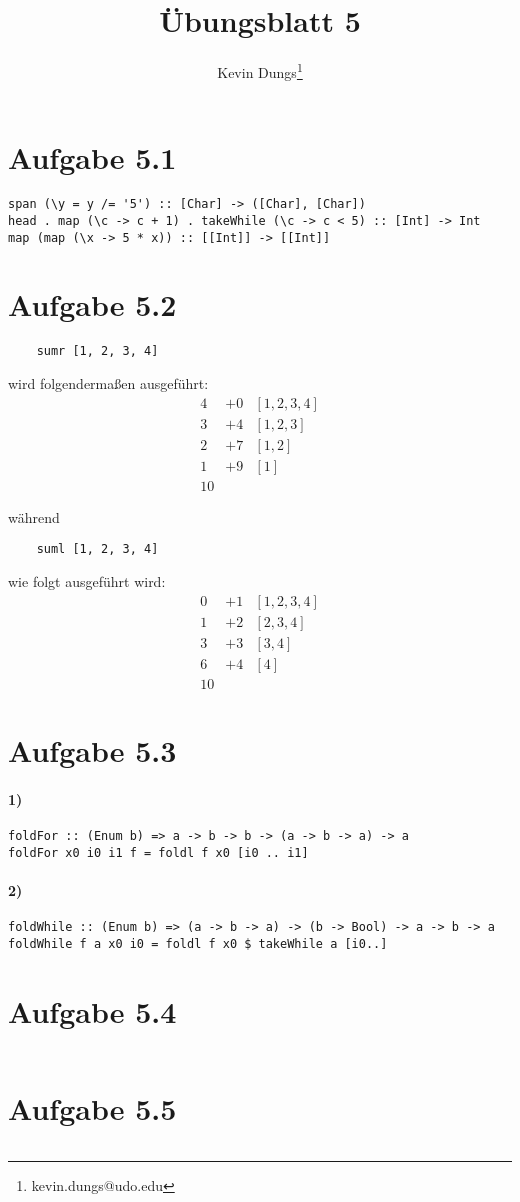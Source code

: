 \documentclass[a4paper]{scrartcl}
\title{Übungsblatt 5}
\author{Kevin Dungs\thanks{kevin.dungs@udo.edu}}
\begin{document}
\maketitle


\section*{Aufgabe 5.1}
\begin{verbatim}
span (\y = y /= '5') :: [Char] -> ([Char], [Char])
head . map (\c -> c + 1) . takeWhile (\c -> c < 5) :: [Int] -> Int
map (map (\x -> 5 * x)) :: [[Int]] -> [[Int]]
\end{verbatim}


\section*{Aufgabe 5.2}
\begin{verbatim}
    sumr [1, 2, 3, 4]
\end{verbatim}
wird folgendermaßen ausgeführt:
\begin{align*}
    4 &+ 0 & [1, 2, 3, 4] \\
    3 &+ 4 & [1, 2, 3] \\
    2 &+ 7 & [1, 2] \\
    1 &+ 9 & [1] \\
    10
\end{align*}

während
\begin{verbatim}
    suml [1, 2, 3, 4]
\end{verbatim}
wie folgt ausgeführt wird:
\begin{align*}
    0 &+ 1 & [1, 2, 3, 4] \\
    1 &+ 2 & [2, 3, 4] \\
    3 &+ 3 & [3, 4] \\
    6 &+ 4 & [4] \\
    10
\end{align*}


\section*{Aufgabe 5.3}
\paragraph{1)}
\begin{verbatim}
foldFor :: (Enum b) => a -> b -> b -> (a -> b -> a) -> a
foldFor x0 i0 i1 f = foldl f x0 [i0 .. i1]
\end{verbatim}

\paragraph{2)}
\begin{verbatim}
foldWhile :: (Enum b) => (a -> b -> a) -> (b -> Bool) -> a -> b -> a
foldWhile f a x0 i0 = foldl f x0 $ takeWhile a [i0..]
\end{verbatim}


\section*{Aufgabe 5.4}
\inputminted{haskell}{binary.hs}


\section*{Aufgabe 5.5}
\inputminted{haskell}{zipper.hs}
\end{document}
